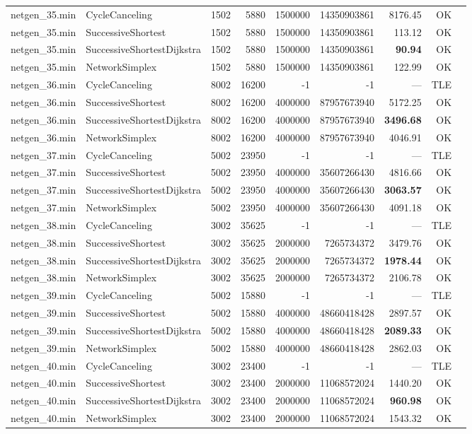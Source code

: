 \begin{longtable}{llrrrrrrl}
\midrule
netgen\_35.min & CycleCanceling & 1502 & 5880 & 1500000 & 14350903861 & 8176.45 & OK \\
netgen\_35.min & SuccessiveShortest & 1502 & 5880 & 1500000 & 14350903861 & 113.12 & OK \\
netgen\_35.min & SuccessiveShortestDijkstra & 1502 & 5880 & 1500000 & 14350903861 & \textbf{90.94} & OK \\
netgen\_35.min & NetworkSimplex & 1502 & 5880 & 1500000 & 14350903861 & 122.99 & OK \\
\midrule
netgen\_36.min & CycleCanceling & 8002 & 16200 & -1 & -1 & --- & TLE \\
netgen\_36.min & SuccessiveShortest & 8002 & 16200 & 4000000 & 87957673940 & 5172.25 & OK \\
netgen\_36.min & SuccessiveShortestDijkstra & 8002 & 16200 & 4000000 & 87957673940 & \textbf{3496.68} & OK \\
netgen\_36.min & NetworkSimplex & 8002 & 16200 & 4000000 & 87957673940 & 4046.91 & OK \\
\midrule
netgen\_37.min & CycleCanceling & 5002 & 23950 & -1 & -1 & --- & TLE \\
netgen\_37.min & SuccessiveShortest & 5002 & 23950 & 4000000 & 35607266430 & 4816.66 & OK \\
netgen\_37.min & SuccessiveShortestDijkstra & 5002 & 23950 & 4000000 & 35607266430 & \textbf{3063.57} & OK \\
netgen\_37.min & NetworkSimplex & 5002 & 23950 & 4000000 & 35607266430 & 4091.18 & OK \\
\midrule
netgen\_38.min & CycleCanceling & 3002 & 35625 & -1 & -1 & --- & TLE \\
netgen\_38.min & SuccessiveShortest & 3002 & 35625 & 2000000 & 7265734372 & 3479.76 & OK \\
netgen\_38.min & SuccessiveShortestDijkstra & 3002 & 35625 & 2000000 & 7265734372 & \textbf{1978.44} & OK \\
netgen\_38.min & NetworkSimplex & 3002 & 35625 & 2000000 & 7265734372 & 2106.78 & OK \\
\midrule
netgen\_39.min & CycleCanceling & 5002 & 15880 & -1 & -1 & --- & TLE \\
netgen\_39.min & SuccessiveShortest & 5002 & 15880 & 4000000 & 48660418428 & 2897.57 & OK \\
netgen\_39.min & SuccessiveShortestDijkstra & 5002 & 15880 & 4000000 & 48660418428 & \textbf{2089.33} & OK \\
netgen\_39.min & NetworkSimplex & 5002 & 15880 & 4000000 & 48660418428 & 2862.03 & OK \\
\midrule
netgen\_40.min & CycleCanceling & 3002 & 23400 & -1 & -1 & --- & TLE \\
netgen\_40.min & SuccessiveShortest & 3002 & 23400 & 2000000 & 11068572024 & 1440.20 & OK \\
netgen\_40.min & SuccessiveShortestDijkstra & 3002 & 23400 & 2000000 & 11068572024 & \textbf{960.98} & OK \\
netgen\_40.min & NetworkSimplex & 3002 & 23400 & 2000000 & 11068572024 & 1543.32 & OK \\
\end{longtable}
\endgroup
